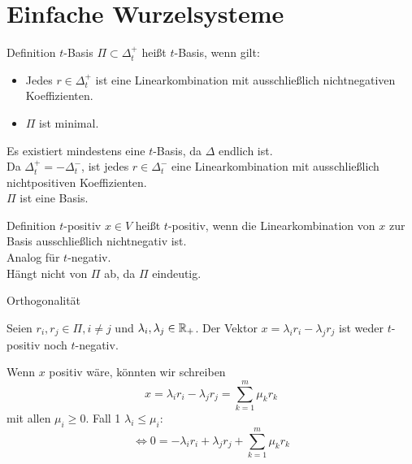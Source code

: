 \documentclass[18pt]{beamer}
\begin{document}
\section{Einfache Wurzelsysteme}
\begin{frame}{Definition \( t \)-Basis}
    \( \Pi \subset \Delta_t^+ \) heißt \( t \)-Basis, 
    wenn gilt:
    \begin{itemize}
        \item Jedes \( r \in \Delta_t^+ \) ist 
        eine Linearkombination mit ausschließlich 
        nichtnegativen Koeffizienten.
        \item \( \Pi \) ist minimal.
    \end{itemize}
    Es existiert mindestens eine \( t \)-Basis, 
    da \( \Delta \) endlich ist.\\
    Da \( \Delta_t^+ = - \Delta_t^- \), ist jedes 
    \( r \in \Delta_t^- \) eine Linearkombination 
    mit ausschließlich nichtpositiven Koeffizienten.\\
    \( \Pi \) ist eine Basis. %
\end{frame}

\begin{frame}{Definition \(t\)-positiv}
    \( x \in V \) heißt \(t\)-positiv, wenn 
    die Linearkombination von \(x\) zur 
    Basis ausschließlich nichtnegativ ist.\\
    Analog für \( t \)-negativ.\\
    Hängt nicht von \( \Pi \) ab, da \( \Pi \) 
    eindeutig.%
\end{frame}

\begin{frame}{Orthogonalität} %
    \begin{satz} %
        Seien \( r_i, r_j \in \Pi, i \neq j \) und 
        \( \lambda_i, \lambda_j \in \mathbb{R}_+ \). 
        Der Vektor \( x = \lambda_i r_i - \lambda_j r_j \) 
        ist weder \( t \)-positiv noch \( t \)-negativ.
    \end{satz}
\end{frame}

\begin{frame}
    \begin{bew}
        Wenn \(x\) positiv wäre, könnten 
        wir schreiben 
        \[ x = \lambda_i r_i - \lambda_j r_j 
        = \sum_{k=1}^m \mu_k r_k \]
        mit allen \( \mu_i \geq 0 \).
        Fall 1 \( \lambda_i \leq \mu_i \):
        \[ \Leftrightarrow 0 
        = - \lambda_i r_i + \lambda_j r_j 
        + \sum_{k=1}^m \mu_k r_k \]
        
        \renewcommand{\qedsymbol}{}
    \end{bew}
\end{frame}
\end{document}
